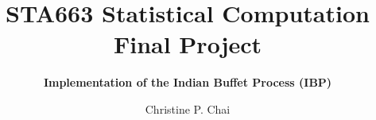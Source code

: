 \documentclass[12pt]{article}
\begin{document}
\vspace{-1in}
\title{\bf STA663 Statistical Computation Final Project}
\author{\bf Implementation of the Indian Buffet Process (IBP)}
\date{Christine P. Chai}
\maketitle 
\vspace{-0.5in}












\end{document}
